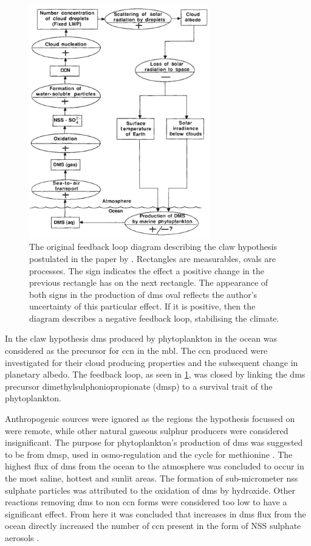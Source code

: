 		\begin{figure}[!htb]
	 	    \centering
	 	    \includegraphics[width=0.7\textwidth,natwidth=1038,natheight=1342]{Fig/Original_Claw_Cycle.png}
	 	    \caption{The original feedback loop diagram describing the \gls{claw} hypothesis postulated in the paper by \citet{charlson:1987fw}. Rectangles are measurables, ovals are processes. The sign indicates the effect a positive change in the previous rectangle has on the next rectangle. The appearance of both signs in the production of \gls{dms} oval reflects the author's uncertainty of this particular effect. If it is positive, then the diagram describes a negative feedback loop, stabilising the climate.}
	 	    \label{fig:origclaw}
	 	\end{figure}

		In the \gls{claw} hypothesis \gls{dms} produced by phytoplankton in the ocean was considered as the precursor for \gls{ccn} in the \gls{mbl}. The \gls{ccn} produced were investigated for their cloud producing properties and the subsequent change in planetary albedo. The feedback loop, as seen in \cref{fig:origclaw}, was closed by linking the \gls{dms} precursor dimethylsulphoniopropionate (\gls{dmsp}) to a survival trait of the phytoplankton.

		Anthropogenic sources were ignored as the regions the hypothesis focussed on were remote, while other natural gaseous sulphur producers were considered insignificant. The purpose for phytoplankton's production of \gls{dms} was suggested to be from \gls{dmsp}, used in osmo-regulation and the cycle for methionine \citep{vairavamurthy:1985gw}. The highest flux of \gls{dms} from the ocean to the atmosphere was concluded to occur in the most saline, hottest and sunlit areas. The formation of sub-micrometer \gls{nss} sulphate particles was attributed to the oxidation of \gls{dms} by hydroxide. Other reactions removing \gls{dms} to non \gls{ccn} forms were considered too low to have a significant effect. From here it was concluded that increases in \gls{dms} flux from the ocean directly increased the number of \gls{ccn} present in the form of NSS sulphate aerosols \citep{charlson:1987fw}.

